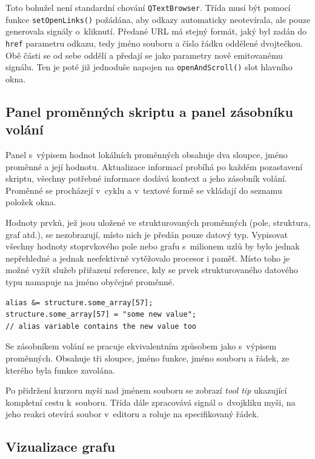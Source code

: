 \documentclass[11pt,twoside,a4paper]{book}
\begin{document}
Toto bohužel není standardní chování \texttt{QTextBrowser}. Třída musí být pomocí funkce \texttt{set\-Open\-Links()} požádána, aby odkazy automaticky neotevírala, ale pouze generovala signály o~kliknutí. Předané URL má stejný formát, jaký byl zadán do \texttt{href} parametru odkazu, tedy jméno souboru a číslo řádku oddělené dvojtečkou. Obě části se od sebe oddělí a předají se jako parametry nově emitovanému signálu. Ten je poté již jednoduše napojen na \texttt{openAndScroll()} slot hlavního okna.


\subsection{Panel proměnných skriptu a panel zásobníku volání}

Panel s~výpisem hodnot lokálních proměnných obsahuje dva sloupce, jméno proměnné a její hodnotu. Aktualizace informací probíhá po každém pozastavení skriptu, všechny potřebné informace dodává kontext a jeho zásobník volání. Proměnné se procházejí v~cyklu a v~textové formě se vkládají do seznamu položek okna.

Hodnoty prvků, jež jsou uložené ve strukturovaných proměnných (pole, struktura, graf atd.), se nezobrazují, místo nich je předán pouze datový typ. Vypisovat všechny hodnoty stoprvkového pole nebo grafu s~milionem uzlů by bylo jednak nepřehledné a jednak neefektivně vytěžovalo procesor i paměť. Místo toho je možné vyžít služeb přiřazení reference, kdy se prvek strukturovaného datového typu namapuje na jméno obyčejné proměnné.

\begin{verbatim}
alias &= structure.some_array[57];
structure.some_array[57] = "some new value";
// alias variable contains the new value too
\end{verbatim}

Se zásobníkem volání se pracuje ekvivalentním způsobem jako s~výpisem proměnných. Obsahuje tři sloupce, jméno funkce, jméno souboru a řádek, ze kterého byla funkce zavolána.

Po přidržení kurzoru myši nad jménem souboru se zobrazí \textit{tool tip} ukazující kompletní cestu k~souboru. Třída dále zpracovává signál o~dvojkliku myši, na jeho reakci otevírá soubor v~editoru a roluje na specifikovaný řádek.


\subsection{Vizualizace grafu}
\end{document}
